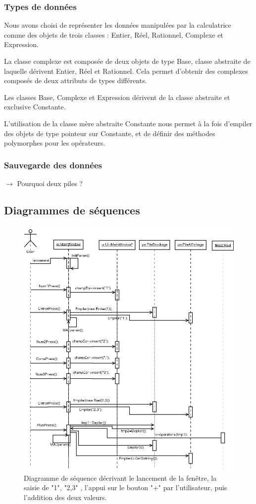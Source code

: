 \documentclass[a4paper,11pt]{article}
\begin{document}
\subsubsection{Types de données}
Nous avons choisi de représenter les données manipulées par la calculatrice comme des objets de trois classes : Entier, Réel, Rationnel, Complexe et Expression. 

La classe complexe est composée de deux objets de type Base, classe abstraite de laquelle dérivent Entier, Réel et Rationnel. Cela permet d'obtenir des complexes composés de deux attributs de types différents.

Les classes Base, Complexe et Expression dérivent de la classe abstraite et exclusive Constante. 

L'utilisation de la classe mère abstraite Constante nous permet à la fois d'empiler des objets de type pointeur sur Constante, et de définir des méthodes polymorphes pour les opérateurs. 

\subsubsection{Sauvegarde des données}
 $\rightarrow$  Pourquoi deux piles ?





\subsection{Diagrammes de séquences}
\begin{figure}[H]
	\center
	\includegraphics[width=16.7cm]{diag_seq_1.png}
	\caption{Diagramme de séquence décrivant le lancement de la fenêtre, la saisie de "1", "2,3" , l'appui sur le bouton "+" par l'utilisateur, puis l'addition des deux valeurs.}
\end{figure}
\end{document}
